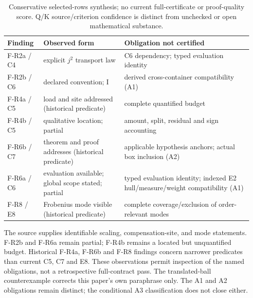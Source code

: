 \documentclass[11pt,a4paper]{article}
\begin{document}
\begin{table}[htbp]
\centering\footnotesize
\begin{tabularx}{\textwidth}{@{}l >{\raggedright\arraybackslash}X >{\raggedright\arraybackslash}X@{}}
\toprule
Finding & Observed form & Obligation not certified \\
\midrule
F-R2a / C4 & explicit $j^2$ transport law & C6 dependency; typed evaluation identity \\
F-R2b / C6 & declared convention; I & derived cross-container compatibility (A1) \\
F-R4a / C5 & load and site addressed (historical predicate) & complete quantified budget \\
F-R4b / C5 & qualitative location; partial & amount, split, residual and sign accounting \\
F-R6b / C7 & theorem and proof addresses (historical predicate) & applicable hypothesis anchors; actual box inclusion (A2) \\
F-R6a / C6 & evaluation available; global scope stated; partial & typed evaluation identity; indexed E2 hull/measure/weight compatibility (A1) \\
F-R8 / E8 & Frobenius mode visible (historical predicate) & complete coverage/exclusion of order-relevant modes \\
\bottomrule
\end{tabularx}
\caption{Conservative selected-rows synthesis; no current full-certificate
or proof-quality score. Q/K source/criterion confidence is distinct
from unchecked or open mathematical substance.}
\label{tab:synthesis}
\end{table}

The source supplies identifiable scaling, compensation-site, and
mode statements. F-R2b and F-R6a remain partial; F-R4b remains a
located but unquantified budget. Historical F-R4a, F-R6b and
F-R8 findings concern narrower predicates than current C5, C7
and E8. These observations permit inspection of the named
obligations, not a retrospective full-contract pass.
The translated-ball counterexample corrects this paper's own
paraphrase only. The A1 and A2 obligations remain distinct;
the conditional A3 classification does not close either.
\end{document}
